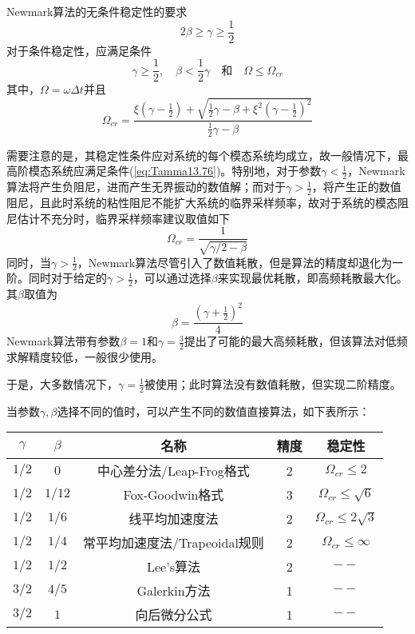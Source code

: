 Newmark算法的无条件稳定性的要求
\begin{equation}
2\beta\ge\gamma\ge\frac{1}{2}
\end{equation}
对于条件稳定性，应满足条件
\begin{equation}
\gamma\ge\frac{1}{2},\quad\beta<\frac{1}{2}\gamma\quad\text{和}\quad\Omega\le\Omega_{cr}
\end{equation}
其中，$\Omega=\omega\Delta t$并且
\begin{equation}
\Omega_{cr}=\frac{\xi(\gamma-\frac{1}{2})+\sqrt{\frac{1}{2}\gamma-\beta+\xi^2(\gamma-\frac12)^2}}{\frac{1}{2}\gamma-\beta}\label{eq:Tamma13.76}
\end{equation}

需要注意的是，其稳定性条件应对系统的每个模态系统均成立，故一般情况下，最高阶模态系统应满足条件(\ref{eq:Tamma13.76})。特别地，对于参数$\gamma<\frac{1}{2}$，Newmark算法将产生负阻尼，进而产生无界振动的数值解；而对于$\gamma>\frac{1}{2}$，将产生正的数值阻尼，且此时系统的粘性阻尼不能扩大系统的临界采样频率，故对于系统的模态阻尼估计不充分时，临界采样频率建议取值如下
\begin{equation}
\Omega_{cr}=\frac{1}{\sqrt{\gamma/2-\beta}}
\end{equation}
同时，当$\gamma>\frac12$，Newmark算法尽管引入了数值耗散，但是算法的精度却退化为一阶。同时对于给定的$\gamma>\frac{1}{2}$，可以通过选择$\beta$来实现最优耗散，即高频耗散最大化。其$\beta$取值为
\begin{equation}
\beta=\frac{(\gamma+\frac{1}{2})^2}{4}
\end{equation}
Newmark算法带有参数$\beta=1$和$\gamma=\frac{3}{2}$提出了可能的最大高频耗散，但该算法对低频求解精度较低，一般很少使用。

于是，大多数情况下，$\gamma=\frac{1}{2}$被使用；此时算法没有数值耗散，但实现二阶精度。

当参数$\gamma,\beta$选择不同的值时，可以产生不同的数值直接算法，如下表所示：
\begin{table}[htbp]
\vspace{0.5em}\centering\wuhao
\begin{tabular}{ccccc}
\toprule[1.5pt]
$\gamma$&$\beta$&名称&精度&稳定性\\
\midrule[1pt]
$1/2$ & $0$ & 中心差分法/Leap-Frog格式 & 2 & $\Omega_{cr}\le2$\\
$1/2$ & $1/12$ & Fox-Goodwin格式 & 3 & $\Omega_{cr}\le\sqrt{6}$\\
$1/2$ & $1/6$ & 线平均加速度法 & 2 & $\Omega_{cr}\le2\sqrt{3}$\\
$1/2$ & $1/4$ & 常平均加速度法/Trapeoidal规则 & 2 & $\Omega_{cr}\le\infty$\\
$1/2$ & $1/2$ & Lee's算法\cite{Lees1966} & 2 & $--$\\
$3/2$ & $4/5$ & Galerkin方法 & 1 & $--$\\
$3/2$ & $1$ & 向后微分公式 & 1 & $--$\\
\bottomrule[1.5pt]
\end{tabular}
\end{table}

